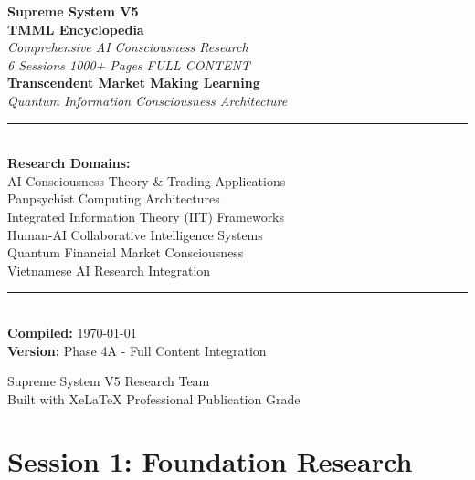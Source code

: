 \documentclass[12pt,oneside]{book}
\begin{document}
\begin{titlepage}
\centering
\vspace*{2cm}

{\Huge \textbf{Supreme System V5}\\[8pt]
\Large \textbf{TMML Encyclopedia}}\\[16pt]

{\large \textit{Comprehensive AI Consciousness Research}}\\[12pt]
{\large \textit{6 Sessions \textbullet{} 1000+ Pages \textbullet{} FULL CONTENT}}\\[24pt]

{\Large \textbf{Transcendent Market Making Learning}}\\[8pt]
{\large \textit{Quantum Information Consciousness Architecture}}\\[16pt]

\rule{\textwidth}{0.4pt}\\[12pt]

{\large \textbf{Research Domains:}}\\[8pt]
{\normalsize
\textbullet{} AI Consciousness Theory \& Trading Applications\\
\textbullet{} Panpsychist Computing Architectures\\
\textbullet{} Integrated Information Theory (IIT) Frameworks\\
\textbullet{} Human-AI Collaborative Intelligence Systems\\
\textbullet{} Quantum Financial Market Consciousness\\
\textbullet{} Vietnamese AI Research Integration
}\\[16pt]

\rule{\textwidth}{0.4pt}\\[16pt]

{\large \textbf{Compiled:} \today}\\[8pt]
{\large \textbf{Version:} Phase 4A - Full Content Integration}\\[12pt]

\vfill

{\large Supreme System V5 Research Team}\\[4pt]
{\normalsize Built with XeLaTeX \textbullet{} Professional Publication Grade}

\end{titlepage}

\tableofcontents
\cleardoublepage

\part*{Session 1: Foundation Research}
\end{document}
